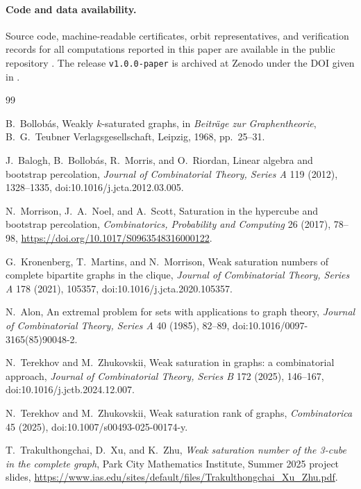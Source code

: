 \documentclass[11pt]{article}
\numberwithin{equation}{section}
\begin{document}
\paragraph{Code and data availability.}
Source code, machine-readable certificates, orbit representatives, and
verification records for all computations reported in this paper are
available in the public repository \cite{SahaCode}. The release
\texttt{v1.0.0-paper} is archived at Zenodo under the DOI given in
\cite{SahaCode}.


\newpage

\begingroup\sloppy
\begin{thebibliography}{99}

B.~Bollob\'as,
\newblock Weakly $k$-saturated graphs,
\newblock in \emph{Beitr\"age zur Graphentheorie}, B.~G.~Teubner Verlagsgesellschaft, Leipzig, 1968, pp.~25--31.

J.~Balogh, B.~Bollob\'as, R.~Morris, and O.~Riordan,
\newblock Linear algebra and bootstrap percolation,
\newblock \emph{Journal of Combinatorial Theory, Series A} 119 (2012), 1328--1335,
\newblock doi:10.1016/j.jcta.2012.03.005.

N.~Morrison, J.~A.~Noel, and A.~Scott,
Saturation in the hypercube and bootstrap percolation, \emph{Combinatorics, Probability and Computing} 26 (2017), 78--98, \url{https://doi.org/10.1017/S0963548316000122}.

G.~Kronenberg, T.~Martins, and N.~Morrison,
\newblock Weak saturation numbers of complete bipartite graphs in the clique,
\newblock \emph{Journal of Combinatorial Theory, Series A} 178 (2021), 105357,
\newblock doi:10.1016/j.jcta.2020.105357.

N.~Alon,
\newblock An extremal problem for sets with applications to graph theory,
\newblock \emph{Journal of Combinatorial Theory, Series A} 40 (1985), 82--89,
\newblock doi:10.1016/0097-3165(85)90048-2.

N.~Terekhov and M.~Zhukovskii,
\newblock Weak saturation in graphs: a combinatorial approach,
\newblock \emph{Journal of Combinatorial Theory, Series B} 172 (2025), 146--167,
\newblock doi:10.1016/j.jctb.2024.12.007.

N.~Terekhov and M.~Zhukovskii,
\newblock Weak saturation rank of graphs,
\newblock \emph{Combinatorica} 45 (2025),
\newblock doi:10.1007/s00493-025-00174-y.

T.~Trakulthongchai, D.~Xu, and K.~Zhu,
\newblock \emph{Weak saturation number of the 3-cube in the complete graph},
\newblock Park City Mathematics Institute, Summer 2025 project slides,
\newblock \url{https://www.ias.edu/sites/default/files/Trakulthongchai_Xu_Zhu.pdf}.


\end{thebibliography}
\end{document}
